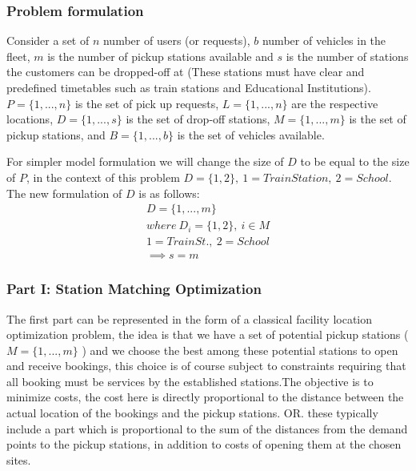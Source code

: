 \documentclass{article}
\begin{document}


\subsubsection*{Problem formulation}


Consider a set of $n$ number of users (or requests), $b$ number of vehicles in the fleet, $m$ is the number of pickup stations available and $s$ is the number of stations the customers can be dropped-off at (These stations must have clear and predefined timetables such as train stations and Educational Institutions). $P = \{ 1, ..., n \}$ is the set of pick up requests, $L = \{ 1, ..., n \}$ are the respective locations, $D =  \{ 1, ..., s \}$ is the set of drop-off stations,  $M =  \{ 1, ..., m \}$ is the set of pickup stations, and $B =  \{ 1, ..., b \}$ is the set of vehicles available.

For simpler model formulation we will change the size of $D$ to be equal to the size of $P$, in the context of this problem $D = \{1,2\},\ 1 = Train Station,\ 2 = School$. The new formulation of $D$ is as follows:
\begin{equation*}
\begin{array}{l}
D = \{1, ..., m\}\\
where\ D_i = \{1,2\}, \ i \in M \\
1 = Train St.,\ 2 = School \\
 \implies s = m 
\end{array}
\end{equation*}

\subsubsection{Part I: Station Matching Optimization}
\label{sebsec:st_alloc}

The first part can be represented in the form of a classical facility location optimization problem, the idea is that we have a set of potential pickup stations (  $M =  \{ 1, ..., m \}$ ) and we choose the best among these potential stations to open and receive bookings, this choice is of course subject to constraints requiring that all booking must be services by the established stations.The objective is to minimize costs, the cost here is directly proportional to the distance between the actual location of the bookings and the pickup stations. OR. these typically include a part which is proportional to the sum of the distances from the demand points to the pickup stations, in addition to costs of opening them at the chosen sites.
\end{document}
